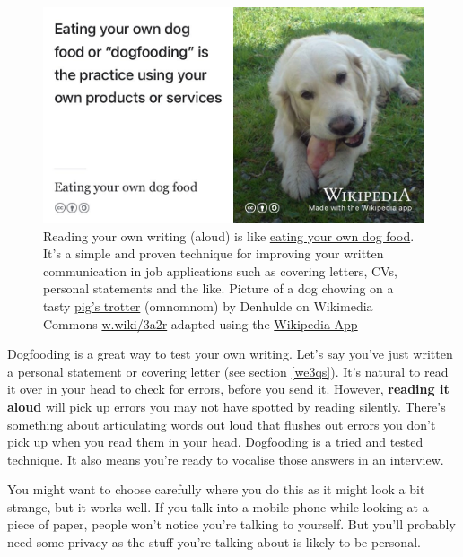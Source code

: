 \documentclass[
]{book}
\begin{document}
\begin{figure}

{\centering \includegraphics[width=1\linewidth]{images/dogfooding-eating-your-own-dogfood} 

}

\caption{Reading your own writing (aloud) is like \href{https://en.wikipedia.org/wiki/Eating_your_own_dog_food}{eating your own dog food}. It's a simple and proven technique for improving your written communication in job applications such as covering letters, CVs, personal statements and the like. Picture of a dog chowing on a tasty \href{https://en.wikipedia.org/wiki/Pig\%27s_trotter}{pig's trotter} (omnomnom) by Denhulde on Wikimedia Commons \href{https://w.wiki/3a2r}{w.wiki/3a2r} adapted using the \href{https://apps.apple.com/us/app/wikipedia/id324715238}{Wikipedia App}}\label{fig:dogfooding-fig}
\end{figure}



Dogfooding is a great way to test your own writing. Let's say you've just written a personal statement or covering letter (see section \ref{we3qs}). It's natural to read it over in your head to check for errors, before you send it. However, \textbf{reading it aloud} will pick up errors you may not have spotted by reading silently. There's something about articulating words out loud that flushes out errors you don't pick up when you read them in your head. Dogfooding is a tried and tested technique. It also means you're ready to vocalise those answers in an interview.

You might want to choose carefully where you do this as it might look a bit strange, but it works well. If you talk into a mobile phone while looking at a piece of paper, people won't notice you're talking to yourself. But you'll probably need some privacy as the stuff you're talking about is likely to be personal.
\end{document}
